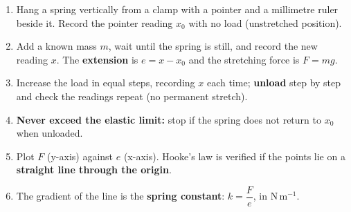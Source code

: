 \documentclass[11pt]{article}
\newcommand{\cle}[1]{{\popxbold\color{popdark}#1}}
\begin{document}
\begin{methode}
\begin{enumerate}
\item Hang a \cle{spring} vertically from a clamp with a pointer and a millimetre ruler beside it. Record the pointer reading $x_0$ with no load (unstretched position).
\item Add a known mass $m$, wait until the spring is still, and record the new reading $x$. The \textbf{extension} is $e=x-x_0$ and the stretching force is $F=mg$.
\item Increase the load in equal steps, recording $x$ each time; \textbf{unload} step by step and check the readings repeat (no permanent stretch).
\item \textbf{Never exceed the elastic limit:} stop if the spring does not return to $x_0$ when unloaded.
\item Plot $F$ (y-axis) against $e$ (x-axis). Hooke's law is verified if the points lie on a \textbf{straight line through the origin}.
\item The gradient of the line is the \textbf{spring constant}: $k=\dfrac{F}{e}$, in $\mathrm{N\,m^{-1}}$.
\end{enumerate}
\end{methode}
\end{document}
